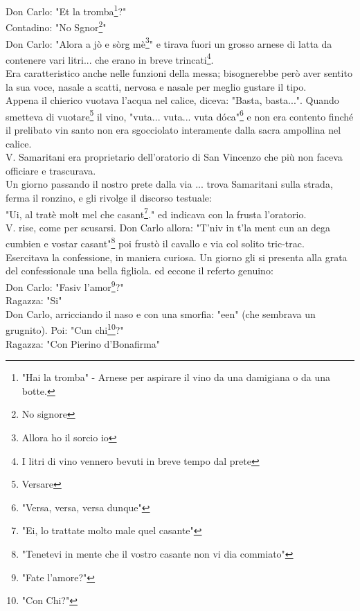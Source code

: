 Don Carlo: "Et la tromba\footnote{"Hai la tromba" - Arnese per aspirare il vino da una damigiana o da una botte.}?"\\
Contadino: "No Sgnor\footnote{No signore}"\\
Don Carlo: "Alora a jò e sòrg mè\footnote{Allora ho il sorcio io}" e tirava fuori un grosso arnese di latta da contenere vari litri... che erano in breve trincati\footnote{I litri di vino vennero bevuti in breve tempo dal prete}.\\
Era caratteristico anche nelle funzioni della messa; bisognerebbe però aver sentito la sua voce, nasale a scatti, nervosa e nasale per meglio gustare il tipo.\\
Appena il chierico vuotava l'acqua nel calice, diceva: "Basta, basta...". Quando smetteva di vuotare\footnote{Versare} il vino, "vuta... vuta... vuta dóca"\footnote{"Versa, versa, versa dunque"} e non era contento finché il prelibato vin santo non era sgocciolato interamente dalla sacra ampollina nel calice.\\
V. Samaritani era proprietario dell'oratorio di San Vincenzo che più non faceva officiare e trascurava.\\
Un giorno passando il nostro prete dalla via ... trova Samaritani sulla strada, ferma il ronzino, e gli rivolge il discorso testuale:\\
"Ui, al tratè molt mel che casant\footnote{"Ei, lo trattate molto male quel casante"}." ed indicava con la frusta l'oratorio.\\
V. rise, come per scusarsi. Don Carlo allora: "T'niv in t'la ment cun an dega cumbien e vostar casant"\footnote{"Tenetevi in mente che il vostro casante non vi dia commiato"} poi frustò il cavallo e via col solito tric-trac.\\
Esercitava la confessione, in maniera curiosa. Un giorno gli si presenta alla grata del confessionale una bella figliola. ed eccone il referto genuino:\\
Don Carlo: "Fasiv l'amor\footnote{"Fate l'amore?"}?"\\
Ragazza: "Si"\\
Don Carlo, arricciando il naso e con una smorfia: "een" (che sembrava un grugnito). Poi: "Cun chi\footnote{"Con Chi?"}?"\\
Ragazza: "Con Pierino d'Bonafirma"\\
